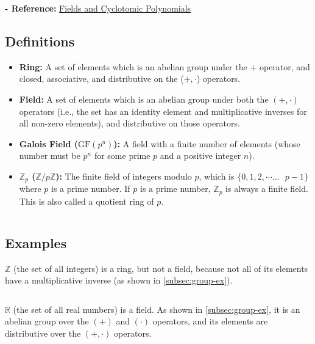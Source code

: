 \textbf{- Reference:} 
\href{https://e.math.cornell.edu/people/belk/numbertheory/CyclotomicPolynomials.pdf}{Fields and Cyclotomic Polynomials}~\cite{cyclotomic-polynomial}

\subsection{Definitions}
\label{subsec:field-def}

\begin{tcolorbox}[title={\textbf{\tboxdef{\ref*{subsec:field-def}} Field Definitions}}]
\begin{itemize}
\item \textbf{Ring:} A set of elements which is an abelian group under the + operator, and closed, associative, and distributive on the ($+, \cdot$) operators. 
\item \textbf{Field:} A set of elements which is an abelian group under both the $(+, \cdot)$ operators (i.e., the set has an identity element and multiplicative inverses for all non-zero elements), and distributive on those operators.
\item \textbf{Galois Field ($\text{GF}(p^n)$):} A field with a finite number of elements (whose number must be $p^n$ for some prime $p$ and a positive integer $n$).
\item \textbf{$\mathbb{Z}_p$ ($\mathbb{Z}/p\mathbb{Z}$):} The finite field of integers modulo $p$, which is $\{0, 1, 2, \cdots... \text{ } p - 1\}$ where $p$ is a prime number. If $p$ is a prime number, $\mathbb{Z}_p$ is always a finite field. This is also called a quotient ring of $p$.
\end{itemize}
\end{tcolorbox}
$ $

\subsection{Examples}
\label{subsec:field-ex}

$\mathbb{Z}$ (the set of all integers) is a ring, but not a field, because not all of its elements have a multiplicative inverse (as shown in \autoref{subsec:group-ex}). 

$ $

\noindent $\mathbb{R}$ (the set of all real numbers) is a field. As shown in \autoref{subsec:group-ex}, it is an abelian group over the $(+)$ and $(\cdot)$ operators, and its elements are distributive over the $(+, \cdot)$ operators.


$ $


